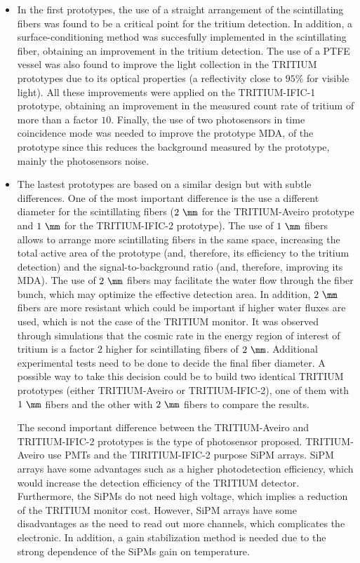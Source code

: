\begin{enumerate}
\begin{itemize}
\item{} In the first prototypes, the use of a straight arrangement of the scintillating fibers was found to be a critical point for the tritium detection. In addition, a surface-conditioning method was succesfully implemented in the scintillating fiber, obtaining an improvement in the tritium detection. The use of a PTFE vessel was also found to improve the light collection in the TRITIUM prototypes due to its optical properties (a reflectivity close to $95\%$ for visible light). All these improvements were applied on the TRITIUM-IFIC-1 prototype, obtaining an improvement in the measured count rate of tritium of more than a factor $10$. Finally, the use of two photosensors in time coincidence mode was needed to improve the prototype MDA, of the prototype since this reduces the background measured by the prototype, mainly the photosensors noise. %

\item{} The lastest prototypes are based on a similar design but with subtle differences. One of the most important difference is the use a different diameter for the scintillating fibers ($2~\mm$ for the TRITIUM-Aveiro prototype and $1~\mm$ for the TRITIUM-IFIC-2 prototype). The use of $1~\mm$ fibers allows to arrange more scintillating fibers in the same space, increasing the total active area of the prototype (and, therefore, its efficiency to the tritium detection) and the signal-to-background ratio (and, therefore, improving its MDA). The use of $2~\mm$ fibers may facilitate the water flow through the fiber bunch, which may optimize the effective detection area. In addition, $2~\mm$ fibers are more resistant which could be important if higher water fluxes are used, which is not the case of the TRITIUM monitor. It was observed through simulations that the cosmic rate in the energy region of interest of tritium is a factor $2$ higher for scintillating fibers of $2~\mm$. Additional experimental tests need to be done to decide the final fiber diameter. A possible way to take this decision could be to build two identical TRITIUM prototypes (either TRITIUM-Aveiro or TRITIUM-IFIC-2), one of them with $1~\mm$ fibers and the other with $2~\mm$ fibers to compare the results. 

The second important difference between the TRITIUM-Aveiro and TRITIUM-IFIC-2 prototypes is the type of photosensor proposed. TRITIUM-Aveiro use PMTs and the TIRITIUM-IFIC-2 purpose SiPM arrays. SiPM arrays have some advantages such as a higher photodetection efficiency, which would increase the detection efficiency of the TRITIUM detector. Furthermore, the SiPMs do not need high voltage, which implies a reduction of the TRITIUM monitor cost. However, SiPM arrays have some disadvantages as the need to read out more channels, which complicates the electronic. In addition, a gain stabilization method is needed due to the strong dependence of the SiPMs gain on temperature.


\end{itemize}
\end{enumerate}
